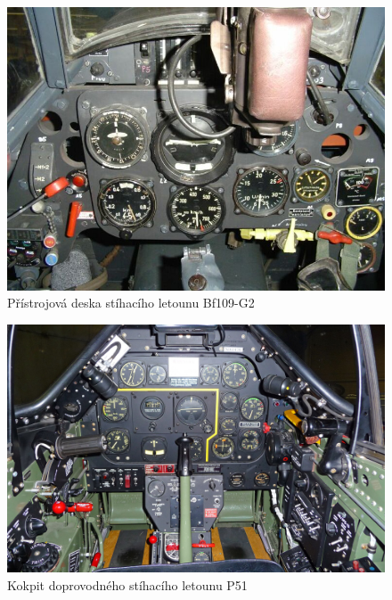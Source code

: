 		\begin{figure}[H]
			\begin{center}
				\includegraphics[scale=0.42]{obrazky-figures/G2_dashboard.jpg}
				\caption{Přístrojová deska stíhacího letounu Bf109-G2\protect\footnotemark}\label{historie::vyvojPristroju::kokpitG2}
			\end{center}
		\end{figure}
	
		\begin{figure}[H]
			\begin{center}
				\includegraphics[scale=0.4]{obrazky-figures/P51-cockpit-1000.jpg}
				\caption{Kokpit doprovodného stíhacího letounu P51\protect\footnotemark}\label{historie::vyvojPristroju::kokpitP51}
			\end{center}
		\end{figure}
		
